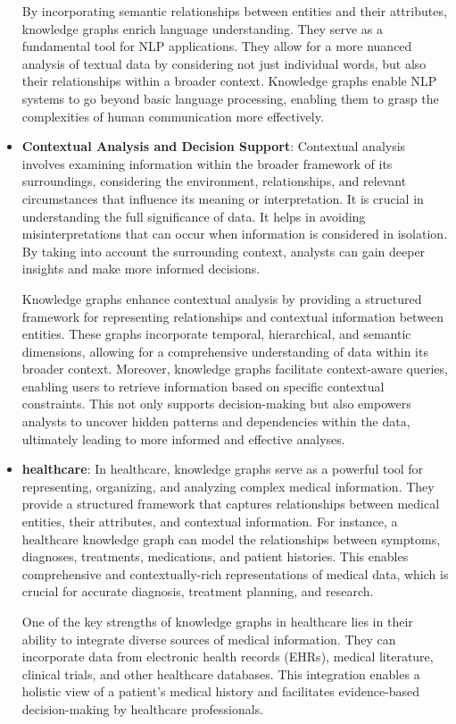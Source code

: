 \begin{itemize}
    By incorporating semantic relationships between entities and their attributes, knowledge graphs enrich language understanding. They serve as a fundamental tool for NLP applications. They allow for a more nuanced analysis of textual data by considering not just individual words, but also their relationships within a broader context. Knowledge graphs enable NLP systems to go beyond basic language processing, enabling them to grasp the complexities of human communication more effectively.
   

    \item \textbf{Contextual Analysis and Decision Support}:
    Contextual analysis involves examining information within the broader framework of its surroundings, considering the environment, relationships, and relevant circumstances that influence its meaning or interpretation. It is crucial in understanding the full significance of data. It helps in avoiding misinterpretations that can occur when information is considered in isolation. By taking into account the surrounding context, analysts can gain deeper insights and make more informed decisions. 
    
    Knowledge graphs enhance contextual analysis by providing a structured framework for representing relationships and contextual information between entities. These graphs incorporate temporal, hierarchical, and semantic dimensions, allowing for a comprehensive understanding of data within its broader context. Moreover, knowledge graphs facilitate context-aware queries, enabling users to retrieve information based on specific contextual constraints. This not only supports decision-making but also empowers analysts to uncover hidden patterns and dependencies within the data, ultimately leading to more informed and effective analyses.

    \item \textbf{healthcare}:
    In healthcare, knowledge graphs serve as a powerful tool for representing, organizing, and analyzing complex medical information. They provide a structured framework that captures relationships between medical entities, their attributes, and contextual information. For instance, a healthcare knowledge graph can model the relationships between symptoms, diagnoses, treatments, medications, and patient histories. This enables comprehensive and contextually-rich representations of medical data, which is crucial for accurate diagnosis, treatment planning, and research.

    One of the key strengths of knowledge graphs in healthcare lies in their ability to integrate diverse sources of medical information. They can incorporate data from electronic health records (EHRs), medical literature, clinical trials, and other healthcare databases. This integration enables a holistic view of a patient's medical history and facilitates evidence-based decision-making by healthcare professionals.
    

\end{itemize}

